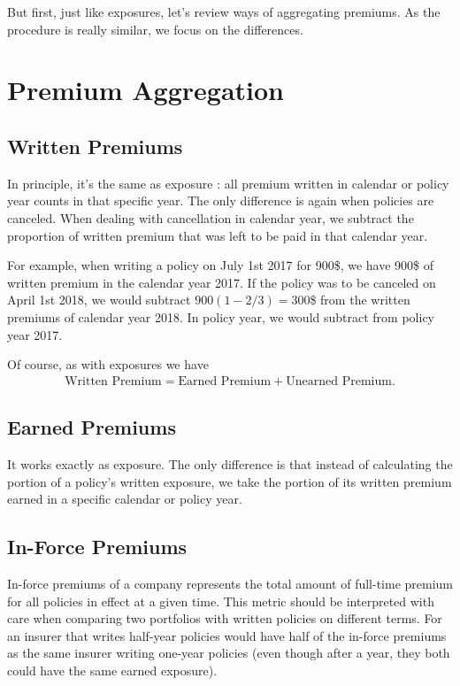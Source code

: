 \documentclass[11pt, english]{memoir}
\numberwithin{definition}{section}
\begin{document}
	But first, just like exposures, let's review ways of aggregating premiums. As the procedure is really similar, we focus on the differences. 
	
\section{Premium Aggregation}
	\subsection{Written Premiums}
		In principle, it's the same as exposure : all premium written in calendar or policy year counts in that specific year. The only difference is again when policies are canceled. When dealing with cancellation in calendar year, we subtract the proportion of written premium that was left to be paid in that calendar year. 
		
		For example, when writing a policy on July 1st 2017 for 900\$, we have 900\$ of written premium in the calendar year 2017. If the policy was to be canceled on April 1st 2018, we would subtract $ 900(1 - 2/3) = 300 $\$ from the written premiums of calendar year 2018. In policy year, we would subtract from policy year 2017.
		
		Of course, as with exposures we have 
		\begin{align*}
		\text{Written Premium} = \text{Earned Premium} + \text{Unearned Premium}.
		\end{align*} 
		
	\subsection{Earned Premiums}
		It works exactly as exposure. The only difference is that instead of calculating the portion of a policy's written exposure, we take the portion of its written premium earned in a specific calendar or policy year. 
		
	\subsection{In-Force Premiums }
		In-force premiums of a company represents the total amount of full-time premium for all policies in effect at a given time. This metric should be interpreted with care when comparing two portfolios with written policies on different terms. For an insurer that writes half-year policies would have half of the in-force premiums as the same insurer writing one-year policies (even though after a year, they both could have the same earned exposure). 
\end{document}
